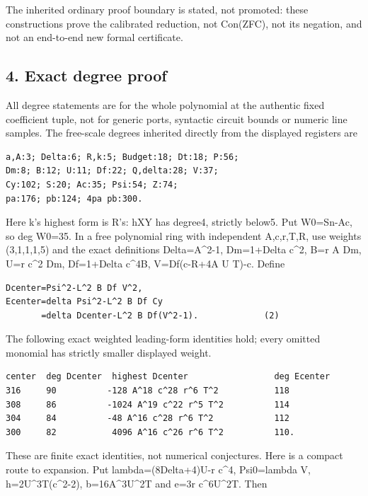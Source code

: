 The inherited ordinary proof boundary is stated, not promoted: these
constructions prove the calibrated reduction, not Con(ZFC), not its
negation, and not an end-to-end new formal certificate.

\subsection{4. Exact degree proof}

All degree statements are for the whole polynomial at the authentic fixed
coefficient tuple, not for generic ports, syntactic circuit bounds or numeric
line samples. The free-scale degrees inherited directly from the displayed
registers are

\begingroup\small
\begin{verbatim}
a,A:3; Delta:6; R,k:5; Budget:18; Dt:18; P:56;
Dm:8; B:12; U:11; Df:22; Q,delta:28; V:37;
Cy:102; S:20; Ac:35; Psi:54; Z:74;
pa:176; pb:124; 4pa pb:300.
\end{verbatim}
\endgroup

Here k's highest form is R's: hXY has degree4, strictly below5.
Put W0=Sn-Ac, so deg W0=35. In a free polynomial ring with independent
A,c,r,T,R, use weights (3,1,1,1,5) and the exact definitions
Delta=A\textasciicircum{}2-1, Dm=1+Delta c\textasciicircum{}2, B=r A Dm, U=r c\textasciicircum{}2 Dm,
Df=1+Delta c\textasciicircum{}4B, V=Df(c-R+4A U T)-c. Define

\begingroup\small
\begin{verbatim}
Dcenter=Psi^2-L^2 B Df V^2,
Ecenter=delta Psi^2-L^2 B Df Cy
       =delta Dcenter-L^2 B Df(V^2-1).             (2)
\end{verbatim}
\endgroup

The following exact weighted leading-form identities hold; every omitted
monomial has strictly smaller displayed weight.

\begingroup\small
\begin{verbatim}
center  deg Dcenter  highest Dcenter                 deg Ecenter
316     90          -128 A^18 c^28 r^6 T^2           118
308     86          -1024 A^19 c^22 r^5 T^2          114
304     84          -48 A^16 c^28 r^6 T^2            112
300     82           4096 A^16 c^26 r^6 T^2          110.
\end{verbatim}
\endgroup

These are finite exact identities, not numerical conjectures. Here is a compact
route to expansion. Put lambda=(8Delta+4)U-r c\textasciicircum{}4, Psi0=lambda V,
h=2U\textasciicircum{}3T(c\textasciicircum{}2-2), b=16A\textasciicircum{}3U\textasciicircum{}2T and e=3r c\textasciicircum{}6U\textasciicircum{}2T. Then

